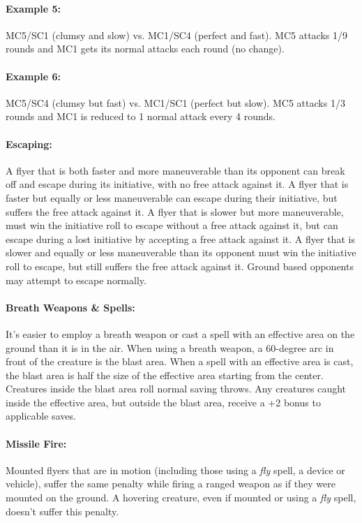 \begin{multicols}{2}
\paragraph{Example 5:} MC5/SC1 (clumsy and slow) vs. MC1/SC4 (perfect and fast). MC5 attacks 1/9 rounds and MC1 gets its normal attacks each round (no change).
 
\paragraph{Example 6:} MC5/SC4 (clumsy but fast) vs. MC1/SC1 (perfect but slow).  MC5 attacks 1/3 rounds and MC1 is reduced to 1 normal attack every 4 rounds.

\paragraph{Escaping:} A flyer that is both faster and more maneuverable than its opponent can break off and escape during its initiative, with no free attack against it.  A flyer that is faster but equally or less maneuverable can escape during their initiative, but suffers the free attack against it.  A flyer that is slower but more maneuverable, must win the initiative roll to escape without a free attack against it, but can escape during a lost initiative by accepting a free attack against it.   A flyer that is slower and equally or less maneuverable than its opponent must win the initiative roll to escape, but still suffers the free attack against it.  Ground based opponents may attempt to escape normally.

\paragraph{Breath Weapons \& Spells:} It's easier to employ a breath weapon or cast a spell with an effective area on the ground than it is in the air.  When using a breath weapon, a 60-degree arc in front of the creature is the blast area.  When a spell with an effective area is cast, the blast area is half the size of the effective area starting from the center.  Creatures inside the blast area roll normal saving throws.  Any creatures caught inside the effective area, but outside the blast area, receive a +2 bonus to applicable saves.

\paragraph{Missile Fire:} Mounted flyers that are in motion (including those using a \textit{fly} spell, a device or vehicle), suffer the same penalty while firing a ranged weapon as if they were mounted on the ground.  A hovering creature, even if mounted or using a \textit{fly} spell, doesn't suffer this penalty.
 

\end{multicols}
